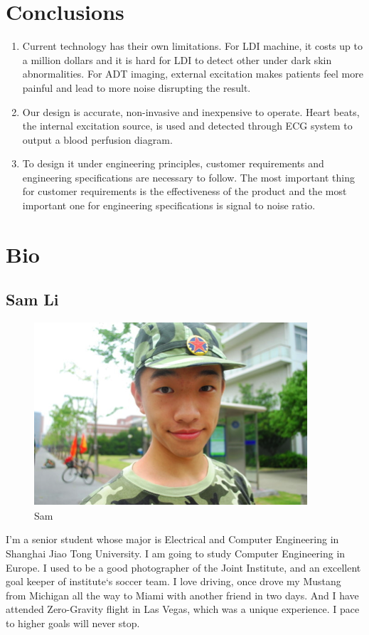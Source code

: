 \documentclass[paper=letter, fontsize=11pt]{scrartcl}
\numberwithin{equation}{section}		%
\numberwithin{figure}{section}			%
\numberwithin{table}{section}			%
\begin{document}
\section{Conclusions}
\begin{enumerate}
\item Current technology has their own limitations. For LDI machine, it costs up to a million dollars and it is 
hard for LDI to detect other under dark skin abnormalities. For ADT imaging, external excitation makes patients
feel more painful and lead to more noise disrupting the result. \\
\item Our design is accurate, non-invasive and inexpensive to operate. Heart beats, the internal excitation source,
is used and detected through ECG system to output a blood perfusion diagram. \\
\item To design it under engineering principles, customer requirements and engineering specifications are necessary
to follow. The most important thing for customer requirements is the effectiveness of the product and the most 
important one for engineering specifications is signal to noise ratio.
\end{enumerate}

\pagebreak
\section{Bio}
\subsection{Sam Li}
\begin{figure}[H]
	\centering
	\includegraphics[scale=1]{lmt}
	\caption{Sam}
\end{figure}
I'm a senior student whose major is Electrical and Computer Engineering in Shanghai Jiao Tong University. I am going to study Computer Engineering in Europe. I used to be a good photographer of the Joint Institute, and an excellent goal keeper of institute`s soccer team. I love driving, once drove my Mustang from Michigan all the way to Miami with another friend in two days. And I have attended Zero-Gravity flight in Las Vegas, which was a unique experience. I pace to higher goals will never stop.
\pagebreak
\end{document}
